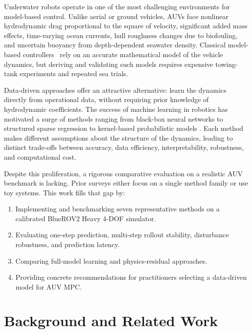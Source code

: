 \documentclass[conference]{IEEEtran}
\begin{document}
Underwater robots operate in one of the most challenging environments for
model-based control. Unlike aerial or ground vehicles, AUVs face nonlinear
hydrodynamic drag proportional to the square of velocity, significant added
mass effects, time-varying ocean currents, hull roughness changes due to
biofouling, and uncertain buoyancy from depth-dependent seawater density.
Classical model-based controllers~\cite{Fossen2011} rely on an accurate
mathematical model of the vehicle dynamics, but deriving and validating such
models requires expensive towing-tank experiments and repeated sea trials.

Data-driven approaches offer an attractive alternative: learn the dynamics
directly from operational data, without requiring prior knowledge of
hydrodynamic coefficients. The success of machine learning in robotics has
motivated a surge of methods ranging from black-box neural networks
\cite{Zhu2020DNNAUV} to structured sparse regression \cite{Brunton2016SINDy}
to kernel-based probabilistic models \cite{Rasmussen2006GP}. Each method
makes different assumptions about the structure of the dynamics, leading to
distinct trade-offs between accuracy, data efficiency, interpretability,
robustness, and computational cost.

Despite this proliferation, a rigorous comparative evaluation on a realistic
AUV benchmark is lacking. Prior surveys either focus on a single method
family or use toy systems. This work fills that gap by:
\begin{enumerate}
    \item Implementing and benchmarking seven representative methods on a
          calibrated BlueROV2 Heavy 4-DOF simulator.
    \item Evaluating one-step prediction, multi-step rollout stability,
          disturbance robustness, and prediction latency.
    \item Comparing full-model learning and physics-residual approaches.
    \item Providing concrete recommendations for practitioners selecting
          a data-driven model for AUV MPC.
\end{enumerate}

\section{Background and Related Work}
\label{sec:related}
\end{document}
